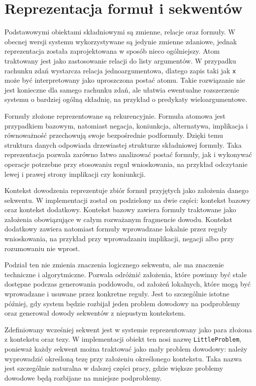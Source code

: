 \documentclass[shortabstract]{iithesis}
\theoremstyle{definition}
\theoremstyle{remark}
\theoremstyle{plain}
\begin{document}
\section{Reprezentacja formuł i sekwentów}

Podstawowymi obiektami składniowymi są zmienne, relacje oraz formuły. W obecnej
wersji systemu wykorzystywane są jedynie zmienne zdaniowe, jednak reprezentacja
została zaprojektowana w sposób nieco ogólniejszy. Atom traktowany jest jako
zastosowanie relacji do listy argumentów. W przypadku rachunku zdań wystarcza
relacja jednoargumentowa, dlatego zapis taki jak \texttt{x} może być interpretowany
jako uproszczona postać atomu. Takie rozwiązanie nie jest konieczne dla samego
rachunku zdań, ale ułatwia ewentualne rozszerzenie systemu o bardziej ogólną
składnię, na przykład o predykaty wieloargumentowe.

Formuły złożone reprezentowane są rekurencyjnie. Formuła atomowa jest przypadkiem
bazowym, natomiast negacja, koniunkcja, alternatywa, implikacja i równoważność
przechowują swoje bezpośrednie podformuły. Dzięki temu struktura danych odpowiada
drzewiastej strukturze składniowej formuły. Taka reprezentacja pozwala zarówno
łatwo analizować postać formuły, jak i wykonywać operacje potrzebne przy stosowaniu
reguł wnioskowania, na przykład odczytanie lewej i prawej strony implikacji czy koniunkcji.

Kontekst dowodzenia reprezentuje zbiór formuł przyjętych jako założenia danego
sekwentu. W implementacji został on podzielony na dwie części: kontekst bazowy oraz
kontekst dodatkowy. Kontekst bazowy zawiera formuły traktowane jako założenia
obowiązujące w całym rozważanym fragmencie dowodu. Kontekst dodatkowy zawiera
natomiast formuły wprowadzane lokalnie przez reguły wnioskowania, na przykład
przy wprowadzaniu implikacji, negacji albo przy rozumowaniu nie wprost.

Podział ten nie zmienia znaczenia logicznego sekwentu, ale ma znaczenie techniczne
i algorytmiczne. Pozwala odróżnić założenia, które powinny być stale dostępne
podczas generowania poddowodu, od założeń lokalnych, które mogą być wprowadzane
i usuwane przez konkretne reguły. Jest to szczególnie istotne później, gdy system
będzie rozbijał jeden problem dowodowy na podproblemy oraz generował dowody
sekwentów z niepustym kontekstem.

Zdefiniowany wcześniej sekwent jest w systemie reprezentowany jako para złożona
z kontekstu oraz tezy. W implementacji obiekt ten nosi nazwę \texttt{LittleProblem},
ponieważ każdy sekwent można traktować jako mały problem dowodowy: należy
wyprowadzić określoną tezę przy założeniu określonego kontekstu. Taka nazwa jest
szczególnie naturalna w dalszej części pracy, gdzie większe problemy dowodowe będą
rozbijane na mniejsze podproblemy.
\end{document}
